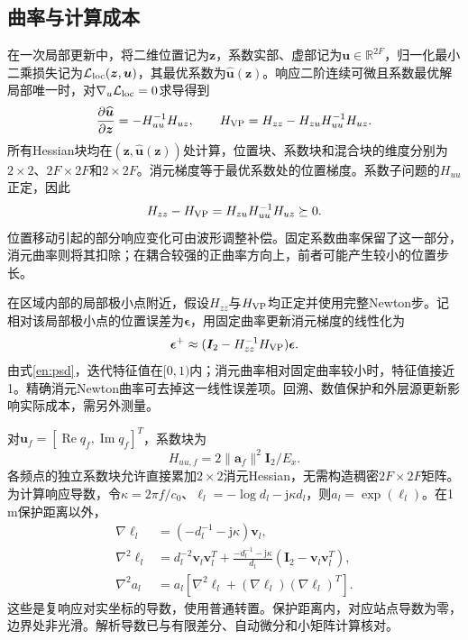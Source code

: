 \documentclass[a4paper,fleqn]{cas-sc}
\newcommand{\R}{\mathbb R}
\newcommand{\Rea}{\operatorname{Re}}
\begin{document}
\subsection{曲率与计算成本}
在一次局部更新中，将二维位置记为$\bm z$，系数实部、虚部记为$\bm u\in\R^{2F}$，归一化最小二乘损失记为$\mathcal L_{\rm loc}(\bm z,\bm u)$，其最优系数为$\widehat{\bm u}(\bm z)$。响应二阶连续可微且系数最优解局部唯一时，对$\nabla_u\mathcal L_{\rm loc}=0$求导得到
\begin{equation}
\frac{\partial\widehat{\bm u}}{\partial\bm z}=-H_{uu}^{-1}H_{uz},\qquad
H_{\rm VP}=H_{zz}-H_{zu}H_{uu}^{-1}H_{uz}.
\label{en:schur}
\end{equation}
所有Hessian块均在$(\bm z,\widehat{\bm u}(\bm z))$处计算，位置块、系数块和混合块的维度分别为$2\times2$、$2F\times2F$和$2\times2F$。消元梯度等于最优系数处的位置梯度\cite{GolubPereyra1973}。系数子问题的$H_{uu}$正定，因此
\begin{equation}
H_{zz}-H_{\rm VP}=H_{zu}H_{uu}^{-1}H_{uz}\succeq0.
\label{en:psd}
\end{equation}
位置移动引起的部分响应变化可由波形调整补偿。固定系数曲率保留了这一部分，消元曲率则将其扣除；在耦合较强的正曲率方向上，前者可能产生较小的位置步长。

在区域内部的局部极小点附近，假设$H_{zz}$与$H_{\rm VP}$均正定并使用完整Newton步。记相对该局部极小点的位置误差为$\bm\epsilon$，用固定曲率更新消元梯度的线性化为
\begin{equation}
\bm\epsilon^+\approx(\bm I_2-H_{zz}^{-1}H_{\rm VP})\bm\epsilon.
\label{en:rate}
\end{equation}
由式\eqref{en:psd}，迭代特征值在$[0,1)$内；消元曲率相对固定曲率较小时，特征值接近1。精确消元Newton曲率可去掉这一线性误差项。回溯、数值保护和外层源更新影响实际成本，需另外测量。

对$\bm u_f=[\Rea q_f,\operatorname{Im}q_f]^T$，系数块为
\begin{equation}
H_{uu,f}=2\|\bm a_f\|^2\bm I_2/E_x.
\end{equation}
各频点的独立系数块允许直接累加$2\times2$消元Hessian，无需构造稠密$2F\times2F$矩阵。为计算响应导数，令$\kappa=2\pi f/c_0$、$\ell_l=-\log d_l-\mathrm j\kappa d_l$，则$a_l=\exp(\ell_l)$。在1\,m保护距离以外，
\begin{align}
\nabla\ell_l&=(-d_l^{-1}-\mathrm j\kappa)\bm v_l,\\
\nabla^2\ell_l&=d_l^{-2}\bm v_l\bm v_l^T+
\frac{-d_l^{-1}-\mathrm j\kappa}{d_l}(\bm I_2-\bm v_l\bm v_l^T),\\
\nabla^2a_l&=a_l[\nabla^2\ell_l+(\nabla\ell_l)(\nabla\ell_l)^T].
\label{en:responseHessian}
\end{align}
这些是复响应对实坐标的导数，使用普通转置。保护距离内，对应站点导数为零，边界处非光滑。解析导数已与有限差分、自动微分和小矩阵计算核对。
\end{document}
